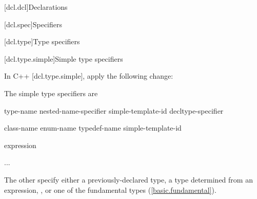 
[dcl.dcl]{Declarations}

[dcl.spec]{Specifiers}

\setcounter{subsection}{5}
[dcl.type]{Type specifiers}

\setcounter{subsubsection}{1}
[dcl.type.simple]{Simple type specifiers}

\pnum
In C++ [dcl.type.simple], apply the following change:

\begin{std.txt}
The simple type specifiers are

\begin{bnf}
\br
     type-name\br
    nested-name-specifier  simple-template-id\br
    \br
    \br
    \br
    \br
    \br
    \br
    \br
    \br
    \br
    \br
    \br
    \br
    \br
    \br
    decltype-specifier\br
\end{bnf}

\begin{bnf}
\br
    class-name\br
    enum-name\br
    typedef-name\br
    simple-template-id
\end{bnf}

\begin{bnf}
\br
   \terminal{(} expression \terminal{)}\br
   \terminal{(}  \terminal{)}
\end{bnf}

\begin{bnf}
\br
\end{bnf}

\begin{bnf}
\br
  \added{\terminal{::}}\br
  \br
  \br
  \br
  \br
  \br
  \br
\end{bnf}

...

The other  specify either a
previously-declared type, a type determined from an expression, , or one of the
fundamental types (\ref{basic.fundamental}).
\end{std.txt}


